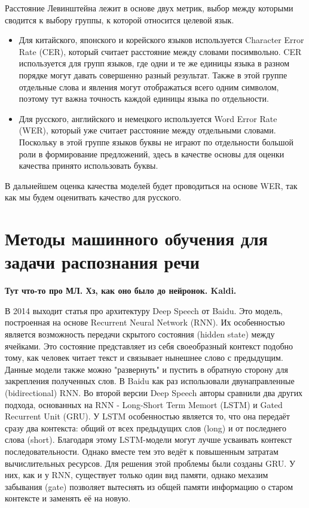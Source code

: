 Расстояние Левинштейна лежит в основе двух метрик, выбор между которыми сводится к выбору группы, к которой относится целевой язык.
\begin{itemize}
  \item Для китайского, японского и корейского языков используется Character Error Rate (CER), который считает расстояние между словами посимвольно.
  CER используется для групп языков, где одни и те же единицы языка в разном порядке могут давать совершенно разный результат.
  Также в этой группе отдельные слова и явления могут отображаться всего одним символом, поэтому тут важна точность каждой единицы языка по отдельности.
  \item Для русского, английского и немецкого используется Word Error Rate (WER), который уже считает расстояние между отдельными словами.
  Поскольку в этой группе языков буквы не играют по отдельности большой роли в формирование предложений, здесь в качестве основы для оценки качества принято использовать буквы.
\end{itemize}

В дальнейшем оценка качества моделей будет проводиться на основе WER, так как мы будем оценитвать качество для русского.

\section{Методы машинного обучения для задачи распознания речи}

\textbf{Тут что-то про МЛ. Хз, как оно было до нейронок. Kaldi.}

В 2014 выходит статья про архитектуру Deep Speech от Baidu. 
Это модель, построенная на основе Recurrent Neural Network (RNN).
Их особенностью является возможность передачи скрытого состояния (hidden state) между ячейками.
Это состояние представляет из себя своеобразный контекст подобно тому, как человек читает текст и связывает нынешнее слово с предыдущим.
Данные модели также можно "развернуть" и пустить в обратную сторону для закрепления полученных слов.
В Baidu как раз использовали двунаправленные (bidirectional) RNN.
Во второй версии Deep Speech авторы сравнили два других подхода, основанных на RNN - Long-Short Term Memort (LSTM) и Gated Recurrent Unit (GRU).
У LSTM особенностью является то, что она передаёт сразу два контекста: общий от всех предыдущих слов (long) и от последнего слова (short).
Благодаря этому LSTM-модели могут лучше усваивать контекст последовательности.
Однако вместе тем это ведёт к повышенным затратам вычислительных ресурсов.
Для решения этой проблемы были созданы GRU.
У них, как и у RNN, существует только один вид памяти, однако мехазим забывания (gate) позволяет вытеснять из общей памяти информацию о старом контексте и заменять её на новую.


